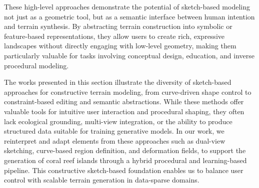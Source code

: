 
These high-level approaches demonstrate the potential of sketch-based modeling not just as a geometric tool, but as a semantic interface between human intention and terrain synthesis. By abstracting terrain construction into symbolic or feature-based representations, they allow users to create rich, expressive landscapes without directly engaging with low-level geometry, making them particularly valuable for tasks involving conceptual design, education, and inverse procedural modeling.

\midConclusion

The works presented in this section illustrate the diversity of sketch-based approaches for constructive terrain modeling, from curve-driven shape control to constraint-based editing and semantic abstractions. While these methods offer valuable tools for intuitive user interaction and procedural shaping, they often lack ecological grounding, multi-view integration, or the ability to produce structured data suitable for training generative models. In our work, we reinterpret and adapt elements from these approaches such as dual-view sketching, curve-based region definition, and deformation fields, to support the generation of coral reef islands through a hybrid procedural and learning-based pipeline. This constructive sketch-based foundation enables us to balance user control with scalable terrain generation in data-sparse domains.




